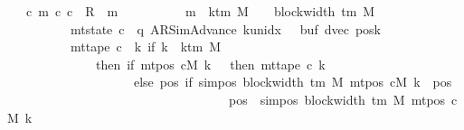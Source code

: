 \begin{isabellebody}
\ \ \ {\isachardoublequoteopen}{\isasymexists}c\ m{\isachardot}{\kern0pt}\ {\isacharparenleft}{\kern0pt}c{}{\isacharcomma}{\kern0pt}\ c{\isacharparenright}{\kern0pt}\ {\isasymin}\ R{\isacharprime}{\kern0pt}\ {\isacharcircum}{\kern0pt}{\isacharcircum}{\kern0pt}\ m\isanewline
\ \ \ \ \ \ \ \ \ {\isasymand}\ m\ {\isasymle}\ k{\isacharunderscore}{\kern0pt}tm\ M\ {\isacharasterisk}{\kern0pt}\ {\isacharparenleft}{\kern0pt}{}\ {\isacharasterisk}{\kern0pt}\ block{\isacharunderscore}{\kern0pt}width\ {\isacharparenleft}{\kern0pt}{\isasymGamma}{\isacharunderscore}{\kern0pt}tm\ M{\isacharparenright}{\kern0pt}{\isacharparenright}{\kern0pt}\isanewline
\ \ \ \ \ \ \ \ \ {\isasymand}\ mt{\isacharunderscore}{\kern0pt}state\ c\ {\isacharequal}{\kern0pt}\ {\isacharparenleft}{\kern0pt}q{\isacharcomma}{\kern0pt}\ AR{\isacharunderscore}{\kern0pt}SimAdvance{\isacharcomma}{\kern0pt}\ k{\isacharunderscore}{\kern0pt}unidx\ {}{\isacharcomma}{\kern0pt}\ {}{\isacharcomma}{\kern0pt}\ buf{\isacharcomma}{\kern0pt}\ dvec{\isacharcomma}{\kern0pt}\ posk{\isacharparenright}{\kern0pt}\isanewline
\ \ \ \ \ \ \ \ \ {\isasymand}\ mt{\isacharunderscore}{\kern0pt}tape\ c\ {\isacharequal}{\kern0pt}\ {\isacharparenleft}{\kern0pt}{\isasymlambda}k{\isachardot}{\kern0pt}\ if\ k\ {\isacharless}{\kern0pt}\ k{\isacharunderscore}{\kern0pt}tm\ M\isanewline
\ \ \ \ \ \ \ \ \ \ \ \ \ \ then\ {\isacharparenleft}{\kern0pt}if\ mt{\isacharunderscore}{\kern0pt}pos\ cM\ k\ {\isacharequal}{\kern0pt}\ {}\ then\ mt{\isacharunderscore}{\kern0pt}tape\ c{}\ k\isanewline
\ \ \ \ \ \ \ \ \ \ \ \ \ \ \ \ \ \ \ \ else\ {\isacharparenleft}{\kern0pt}{\isasymlambda}pos{\isachardot}{\kern0pt}\ if\ sim{\isacharunderscore}{\kern0pt}pos\ {\isacharparenleft}{\kern0pt}block{\isacharunderscore}{\kern0pt}width\ {\isacharparenleft}{\kern0pt}{\isasymGamma}{\isacharunderscore}{\kern0pt}tm\ M{\isacharparenright}{\kern0pt}{\isacharparenright}{\kern0pt}\ {\isacharparenleft}{\kern0pt}mt{\isacharunderscore}{\kern0pt}pos\ cM\ k{\isacharparenright}{\kern0pt}\ {\isasymle}\ pos\isanewline
\ \ \ \ \ \ \ \ \ \ \ \ \ \ \ \ \ \ \ \ \ \ \ \ \ \ \ \ \ \ \ \ \ \ {\isasymand}\ pos\ {\isacharless}{\kern0pt}\ sim{\isacharunderscore}{\kern0pt}pos\ {\isacharparenleft}{\kern0pt}block{\isacharunderscore}{\kern0pt}width\ {\isacharparenleft}{\kern0pt}{\isasymGamma}{\isacharunderscore}{\kern0pt}tm\ M{\isacharparenright}{\kern0pt}{\isacharparenright}{\kern0pt}\ {\isacharparenleft}{\kern0pt}mt{\isacharunderscore}{\kern0pt}pos\ cM\ k{\isacharparenright}{\kern0pt}\isanewline

\end{isabellebody}
